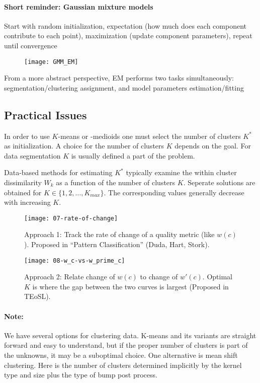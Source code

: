 \paragraph{Short reminder: Gaussian mixture models}

Start with random initialization, expectation (how much does each component contribute to each point), maximization (update component parameters), repeat until convergence

\begin{figure}[H]
  \centering
  \texttt{[image: GMM\_EM]}
\end{figure}

From a more abstract perspective, EM performs two tasks simultaneously: segmentation/clustering assignment, and model parameters estimation/fitting

 \subsection*{Practical Issues}
 In order to use \(K\)-means or -medioids one must select the number of clusters \(K^*\) as initialization. A choice for the number of clusters \(K\) depends on the goal. For data segmentation \(K\) is usually defined a part of the problem.

 Data-based methods for estimating \(K^*\) typically examine the within cluster dissimilarity \(W_k\) as a function of the number of clusters \(K\). Seperate solutions are obtained for \(K \in \{1,2,\dots,K_{max}\}\). The corresponding values generally decrease with increasing \(K\).

\begin{figure}[H]
 	\centering
 	\begin{minipage}[b]{0.49\textwidth}
   	\texttt{[image: 07-rate-of-change]}
   \caption{Approach 1: Track the rate of change of a quality metric (like $w(c)$). Proposed in ``Pattern Classification'' (Duda, Hart, Stork).}
 	\end{minipage}
 	\begin{minipage}[b]{0.49\textwidth}
   	\texttt{[image: 08-w\_c-vs-w\_prime\_c]}
   \caption{Approach 2: Relate change of $w(c)$ to change of $w'(c)$. Optimal \(K\) is where the gap between the two curves is largest (Proposed in TEoSL).}
 	\end{minipage}
\end{figure}

\paragraph{Note:}
We have several options for clustering data. K-means and its variants are straight forward and easy to understand, but if the proper number of clusters is part of the unknowns, it may be a suboptimal choice.
One alternative is mean shift clustering. Here is the number of clusters determined implicitly by the kernel type and size plus the type of bump post process.
